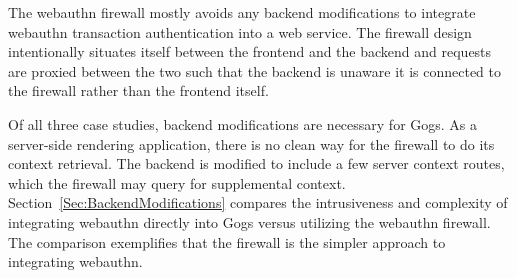 The webauthn firewall mostly avoids any backend modifications to integrate webauthn transaction authentication into a web service. The firewall design intentionally situates itself between the frontend and the backend and requests are proxied between the two such that the backend is unaware it is connected to the firewall rather than the frontend itself.

Of all three case studies, backend modifications are necessary for Gogs. As a server-side rendering application, there is no clean way for the firewall to do its context retrieval. The backend is modified to include a few server context routes, which the firewall may query for supplemental context. Section~\ref{Sec:BackendModifications} compares the intrusiveness and complexity of integrating webauthn directly into Gogs versus utilizing the webauthn firewall. The comparison exemplifies that the firewall is the simpler approach to integrating webauthn.








